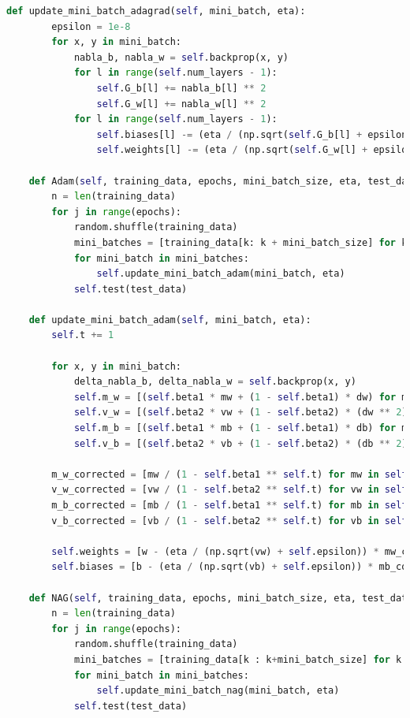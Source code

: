 \documentclass[a4paper, 14pt]{extarticle}
\begin{document}
\begin{lstlisting}[language={python},caption={Методы оптимизации на примере многослойного персептрона, генетический алгоритм},label={lst:code1}]
    def update_mini_batch_adagrad(self, mini_batch, eta):
        epsilon = 1e-8
        for x, y in mini_batch:
            nabla_b, nabla_w = self.backprop(x, y)
            for l in range(self.num_layers - 1):
                self.G_b[l] += nabla_b[l] ** 2
                self.G_w[l] += nabla_w[l] ** 2
            for l in range(self.num_layers - 1):
                self.biases[l] -= (eta / (np.sqrt(self.G_b[l] + epsilon))) * nabla_b[l]
                self.weights[l] -= (eta / (np.sqrt(self.G_w[l] + epsilon))) * nabla_w[l]

    def Adam(self, training_data, epochs, mini_batch_size, eta, test_data):
        n = len(training_data)
        for j in range(epochs):
            random.shuffle(training_data)
            mini_batches = [training_data[k: k + mini_batch_size] for k in range(0, n, mini_batch_size)]
            for mini_batch in mini_batches:
                self.update_mini_batch_adam(mini_batch, eta)
            self.test(test_data)

    def update_mini_batch_adam(self, mini_batch, eta):
        self.t += 1

        for x, y in mini_batch:
            delta_nabla_b, delta_nabla_w = self.backprop(x, y)
            self.m_w = [(self.beta1 * mw + (1 - self.beta1) * dw) for mw, dw in zip(self.m_w, delta_nabla_w)]
            self.v_w = [(self.beta2 * vw + (1 - self.beta2) * (dw ** 2)) for vw, dw in zip(self.v_w, delta_nabla_w)]
            self.m_b = [(self.beta1 * mb + (1 - self.beta1) * db) for mb, db in zip(self.m_b, delta_nabla_b)]
            self.v_b = [(self.beta2 * vb + (1 - self.beta2) * (db ** 2)) for vb, db in zip(self.v_b, delta_nabla_b)]

        m_w_corrected = [mw / (1 - self.beta1 ** self.t) for mw in self.m_w]
        v_w_corrected = [vw / (1 - self.beta2 ** self.t) for vw in self.v_w]
        m_b_corrected = [mb / (1 - self.beta1 ** self.t) for mb in self.m_b]
        v_b_corrected = [vb / (1 - self.beta2 ** self.t) for vb in self.v_b]

        self.weights = [w - (eta / (np.sqrt(vw) + self.epsilon)) * mw_corr for w, vw, mw_corr in zip(self.weights, v_w_corrected, m_w_corrected)]
        self.biases = [b - (eta / (np.sqrt(vb) + self.epsilon)) * mb_corr for b, vb, mb_corr in zip(self.biases, v_b_corrected, m_b_corrected)]

    def NAG(self, training_data, epochs, mini_batch_size, eta, test_data):
        n = len(training_data)
        for j in range(epochs):
            random.shuffle(training_data)
            mini_batches = [training_data[k : k+mini_batch_size] for k in range(0, n, mini_batch_size)]
            for mini_batch in mini_batches:
                self.update_mini_batch_nag(mini_batch, eta)
            self.test(test_data)


\end{lstlisting}
\end{document}
